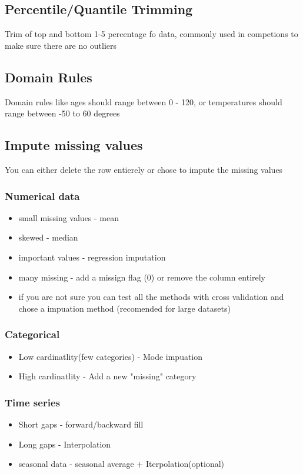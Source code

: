 \documentclass[12pt]{extarticle}
\begin{document}
\subsection{Percentile/Quantile Trimming}
Trim of top and bottom 1-5 percentage fo data, commonly used in competions
to make sure there are no outliers 
\subsection{Domain Rules}
Domain rules like ages should range between 0 - 120, or temperatures
should range between -50 to 60 degrees

\subsection{Impute missing values}
You can either delete the row entierely or chose to impute the missing values
\subsubsection{Numerical data}
\begin{itemize}
    \item small missing values - mean
    \item skewed - median
    \item important values - regression imputation
    \item many missing - add a missign flag (0) or remove the column entirely
    \item if you are not sure you can test all the methods with cross validation 
        and chose a impuation method (recomended for large datasets)
\end{itemize}
\subsubsection{Categorical}
\begin{itemize}
    \item Low cardinatlity(few categories) - Mode impuation
    \item High cardinatlity - Add a new "missing" category
\end{itemize}

\subsubsection{Time series}
\begin{itemize}
    \item Short gaps - forward/backward fill
    \item Long gaps - Interpolation 
    \item seasonal data - seasonal average + Iterpolation(optional)
\end{itemize}
\end{document}
